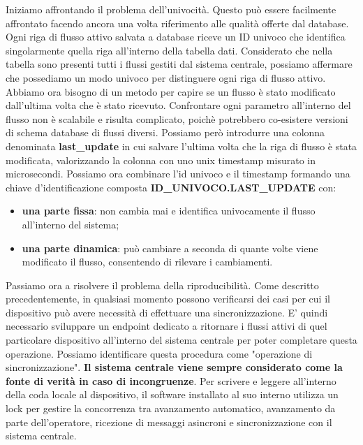 \documentclass[a4paper, titlepage, 12pt, openright, twoside]{book}
\begin{document}
Iniziamo affrontando il problema dell'univocità. Questo può essere facilmente affrontato facendo ancora una volta riferimento alle qualità offerte dal database. Ogni riga di flusso attivo salvata a database riceve un ID univoco che identifica singolarmente quella riga all'interno della tabella dati. Considerato che nella tabella sono presenti tutti i flussi gestiti dal sistema centrale, possiamo affermare che possediamo un modo univoco per distinguere ogni riga di flusso attivo.
\newline
Abbiamo ora bisogno di un metodo per capire se un flusso è stato modificato dall'ultima volta che è stato ricevuto. Confrontare ogni parametro all'interno del flusso non è scalabile e risulta complicato, poichè potrebbero co-esistere versioni di schema database di flussi diversi. Possiamo però introdurre una colonna denominata \textbf{last\_update} in cui salvare l'ultima volta che la riga di flusso è stata modificata, valorizzando la colonna con uno unix timestamp misurato in microsecondi.
\newline
Possiamo ora combinare l'id univoco e il timestamp formando una chiave d'identificazione composta \textbf{ID\_UNIVOCO.LAST\_UPDATE} con:
\begin{itemize}
	\item \textbf{una parte fissa}: non cambia mai e identifica univocamente il flusso all'interno del sistema;
	\item \textbf{una parte dinamica}: può cambiare a seconda di quante volte viene modificato il flusso, consentendo di rilevare i cambiamenti.
\end{itemize}
Passiamo ora a risolvere il problema della riproducibilità. Come descritto precedentemente, in qualsiasi momento possono verificarsi dei casi per cui il dispositivo può avere necessità di effettuare una sincronizzazione. E' quindi necessario sviluppare un endpoint dedicato a ritornare i flussi attivi di quel particolare dispositivo all'interno del sistema centrale per poter completare questa operazione. Possiamo identificare questa procedura come "operazione di sincronizzazione". \textbf{Il sistema centrale viene sempre considerato come la fonte di verità in caso di incongruenze}. Per scrivere e leggere all'interno della coda locale al dispositivo, il software installato al suo interno utilizza un lock per gestire la concorrenza tra avanzamento automatico, avanzamento da parte dell'operatore, ricezione di messaggi asincroni e sincronizzazione con il sistema centrale.
\end{document}
